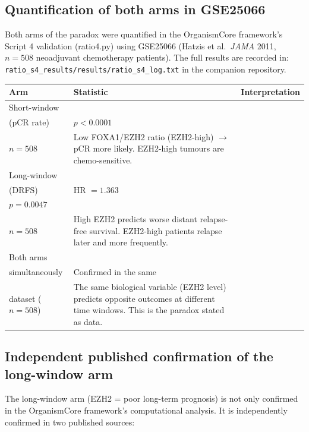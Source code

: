 \documentclass[12pt, a4paper]{article}
\begin{document}
\subsection{Quantification of both arms in GSE25066}

Both arms of the paradox were quantified in the
OrganismCore framework's Script 4 validation
(ratio4.py) using GSE25066 (Hatzis et al.\
\textit{JAMA} 2011, $n=508$ neoadjuvant chemotherapy
patients). The full results are recorded in:
\texttt{ratio\_s4\_results/results/ratio\_s4\_log.txt}
in the companion repository.

\begin{center}
\begin{tabular}{p{3.5cm}p{4cm}p{5.5cm}}
\toprule
\textbf{Arm} & \textbf{Statistic} & \textbf{Interpretation} \\
\midrule
Short-window\\(pCR rate)
& $p < 0.0001$\\$n = 508$
& Low FOXA1/EZH2 ratio (EZH2-high)
  $\rightarrow$ pCR more likely.
  EZH2-high tumours are
  chemo-sensitive. \\[0.4em]
Long-window\\(DRFS)
& HR $= 1.363$\\$p = 0.0047$\\$n = 508$
& High EZH2 predicts worse
  distant relapse-free survival.
  EZH2-high patients relapse
  later and more frequently. \\[0.4em]
Both arms\\simultaneously
& Confirmed in the same\\dataset
  ($n=508$)
& The same biological variable
  (EZH2 level) predicts opposite
  outcomes at different time
  windows. This is the paradox
  stated as data. \\
\bottomrule
\end{tabular}
\end{center}

\subsection{Independent published confirmation of
the long-window arm}

The long-window arm (EZH2 = poor long-term prognosis)
is not only confirmed in the OrganismCore framework's
computational analysis. It is independently confirmed
in two published sources:
\end{document}
